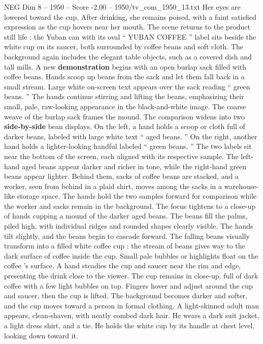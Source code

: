 \begin{textsample}{NEG Dim 8 – 1950 – Score -2.00 – 1950/tv\_com\_1950\_13.txt}
Her eyes are lowered toward the cup.
After drinking, she remains poised, with a faint satisfied expression as the cup hovers near her mouth.
The scene returns to the product still life : the Yuban can with its oval “ YUBAN COFFEE ” label sits beside the white cup on its saucer, both surrounded by coffee beans and soft cloth.
The background again includes the elegant table objects, such as a covered dish and tall mills.
A new \textbf{demonstration} begins with an open burlap sack filled with coffee beans.
Hands scoop up beans from the sack and let them fall back in a small stream.
Large white on-screen text appears over the sack reading “ green beans. ” The hands continue stirring and lifting the beans, emphasizing their small, pale, raw-looking appearance in the black-and-white image.
The coarse weave of the burlap sack frames the mound.
The comparison widens into two \textbf{side-by-side} bean displays.
On the left, a hand holds a scoop or cloth full of darker beans, labeled with large white text “ aged beans. ” On the right, another hand holds a lighter-looking handful labeled “ green beans. ” The two labels sit near the bottom of the screen, each aligned with its respective sample.
The left-hand aged beans appear darker and richer in tone, while the right-hand green beans appear lighter.
Behind them, sacks of coffee beans are stacked, and a worker, seen from behind in a plaid shirt, moves among the sacks in a warehouse-like storage space.
The hands hold the two samples forward for comparison while the worker and sacks remain in the background.
The focus tightens to a close-up of hands cupping a mound of the darker aged beans.
The beans fill the palms, piled high, with individual ridges and rounded shapes clearly visible.
The hands tilt slightly, and the beans begin to cascade forward.
The falling beans visually transform into a filled white coffee cup : the stream of beans gives way to the dark surface of coffee inside the cup.
Small pale bubbles or highlights float on the coffee ’s surface.
A hand steadies the cup and saucer near the rim and edge, presenting the drink close to the viewer.
The cup remains in close-up, full of dark coffee with a few light bubbles on top.
Fingers hover and adjust around the cup and saucer, then the cup is lifted.
The background becomes darker and softer, and the cup moves toward a person in formal clothing.
A light-skinned adult man appears, clean-shaven, with neatly combed dark hair.
He wears a dark suit jacket, a light dress shirt, and a tie.
He holds the white cup by its handle at chest level, looking down toward it.

\end{textsample}
